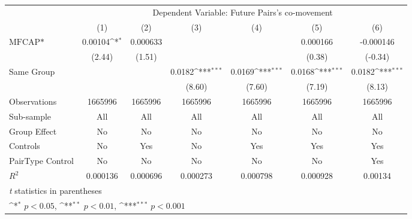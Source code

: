 {
\def\sym#1{\ifmmode^{#1}\else\(^{#1}\)\fi}
\begin{tabular}{l*{6}{c}}
\hline\hline
                &\multicolumn{6}{c}{Dependent Variable: Future Pairs's co-movement}                                               \\\cmidrule(lr){2-7}
                &\multicolumn{1}{c}{(1)}         &\multicolumn{1}{c}{(2)}         &\multicolumn{1}{c}{(3)}         &\multicolumn{1}{c}{(4)}         &\multicolumn{1}{c}{(5)}         &\multicolumn{1}{c}{(6)}         \\
\hline
$ \text{MFCAP*} $&  0.00104\sym{*}  & 0.000633         &                  &                  & 0.000166         &-0.000146         \\
                &   (2.44)         &   (1.51)         &                  &                  &   (0.38)         &  (-0.34)         \\
[1em]
Same Group      &                  &                  &   0.0182\sym{***}&   0.0169\sym{***}&   0.0168\sym{***}&   0.0182\sym{***}\\
                &                  &                  &   (8.60)         &   (7.60)         &   (7.19)         &   (8.13)         \\
\hline
Observations    &  1665996         &  1665996         &  1665996         &  1665996         &  1665996         &  1665996         \\
Sub-sample      &      All         &      All         &      All         &      All         &      All         &      All         \\
Group Effect    &       No         &       No         &       No         &       No         &       No         &       No         \\
Controls        &       No         &      Yes         &       No         &      Yes         &      Yes         &      Yes         \\
PairType Control&       No         &       No         &       No         &       No         &       No         &      Yes         \\
$ R^2 $         & 0.000136         & 0.000696         & 0.000273         & 0.000798         & 0.000928         &  0.00134         \\
\hline\hline
\multicolumn{7}{l}{\footnotesize \textit{t} statistics in parentheses}\\
\multicolumn{7}{l}{\footnotesize \sym{*} \(p<0.05\), \sym{**} \(p<0.01\), \sym{***} \(p<0.001\)}\\
\end{tabular}
}
